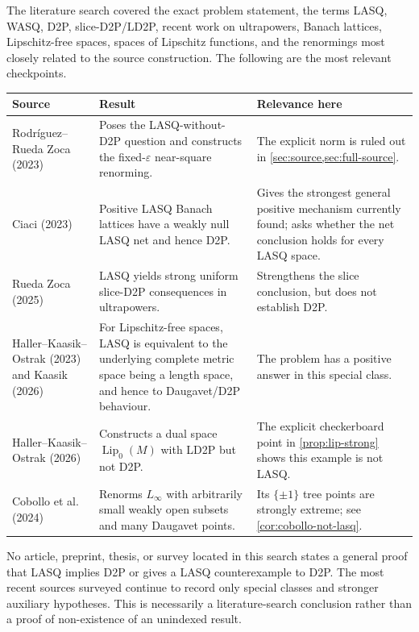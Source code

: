 \documentclass[11pt]{article}
\newcommand{\eps}{\varepsilon}
\newcommand{\Lip}{\operatorname{Lip}}
\begin{document}
The literature search covered the exact problem statement, the terms LASQ, WASQ, D2P, slice-D2P/LD2P, recent work on ultrapowers, Banach lattices, Lipschitz-free spaces, spaces of Lipschitz functions, and the renormings most closely related to the source construction.  The following are the most relevant checkpoints.

\begin{center}
\begin{tabularx}{\textwidth}{@{}>{\raggedright\arraybackslash}p{}X>{\raggedright\arraybackslash}p{}@{}}
\toprule
Source & Result & Relevance here\\
\midrule
Rodr\'iguez--Rueda Zoca (2023) \cite{RodriguezRueda2023} & Poses the LASQ-without-D2P question and constructs the fixed-$\eps$ near-square renorming. & The explicit norm is ruled out in \cref{sec:source,sec:full-source}.\\
Ciaci (2023) \cite{Ciaci2023} & Positive LASQ Banach lattices have a weakly null LASQ net and hence D2P. & Gives the strongest general positive mechanism currently found; asks whether the net conclusion holds for every LASQ space.\\
Rueda Zoca (2025) \cite{RuedaZoca2025} & LASQ yields strong uniform slice-D2P consequences in ultrapowers. & Strengthens the slice conclusion, but does not establish D2P.\\
Haller--Kaasik--Ostrak (2023) and Kaasik (2026) \cite{HKO2023,KaasikThesis2026} & For Lipschitz-free spaces, LASQ is equivalent to the underlying complete metric space being a length space, and hence to Daugavet/D2P behaviour. & The problem has a positive answer in this special class.\\
Haller--Kaasik--Ostrak (2026) \cite{HallerKaasikOstrak2026} & Constructs a dual space $\Lip_0(M)$ with LD2P but not D2P. & The explicit checkerboard point in \cref{prop:lip-strong} shows this example is not LASQ.\\
Cobollo et al. (2024) \cite{CobolloEtAl2024} & Renorms $L_\infty$ with arbitrarily small weakly open subsets and many Daugavet points. & Its $\{\pm1\}$ tree points are strongly extreme; see \cref{cor:cobollo-not-lasq}.\\
\bottomrule
\end{tabularx}
\end{center}

No article, preprint, thesis, or survey located in this search states a general proof that LASQ implies D2P or gives a LASQ counterexample to D2P.  The most recent sources surveyed continue to record only special classes and stronger auxiliary hypotheses.  This is necessarily a literature-search conclusion rather than a proof of non-existence of an unindexed result.
\end{document}
